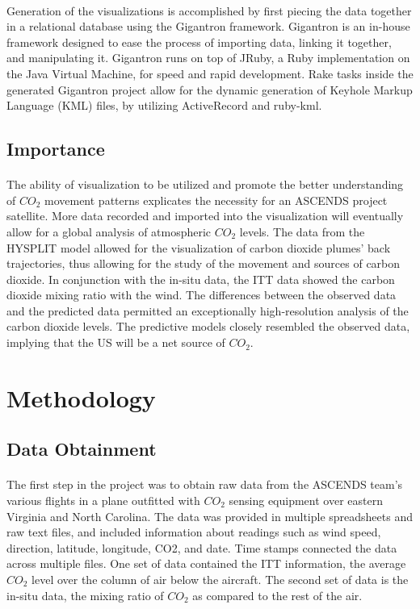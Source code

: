 \documentclass[12pt,letterpaper]{report}
\begin{document}
   \paragraph{}
    Generation of the visualizations is accomplished by first piecing the data together in a relational database using the Gigantron framework. Gigantron is an in-house framework designed to ease the process of importing data, linking it together, and manipulating it. Gigantron runs on top of JRuby, a Ruby implementation on the Java Virtual Machine, for speed and rapid development. Rake tasks inside the generated Gigantron project allow for the dynamic generation of Keyhole Markup Language (KML) files, by utilizing ActiveRecord and ruby-kml.
  \subsection*{Importance}
   \paragraph{}
    The ability of visualization to be utilized and promote the better understanding of $CO_2$ movement patterns explicates the necessity for an ASCENDS project satellite. More data recorded and imported into the visualization will eventually allow for a global analysis of atmospheric $CO_2$ levels. The data from the HYSPLIT model allowed for the visualization of carbon dioxide plumes' back trajectories, thus allowing for the study of the movement and sources of carbon dioxide. In conjunction with the in-situ data, the ITT data showed the carbon dioxide mixing ratio with the wind. The differences between the observed data and the predicted data permitted an exceptionally high-resolution analysis of the carbon dioxide levels. The predictive models closely resembled the observed data, implying that the US will be a net source of $CO_2$.
 \section*{Methodology}
  \subsection*{Data Obtainment}
   \paragraph{}
    The first step in the project was to obtain raw data from the ASCENDS team's various flights in a plane outfitted with $CO_2$ sensing equipment over eastern Virginia and North Carolina.  The data was provided in multiple spreadsheets and raw text files, and included information about readings such as wind speed, direction, latitude, longitude, CO2, and date. Time stamps connected the data across multiple files. One set of data contained the ITT information, the average $CO_2$ level over the column of air below the aircraft. The second set of data is the in-situ data, the mixing ratio of $CO_2$ as compared to the rest of the air.
\end{document}
